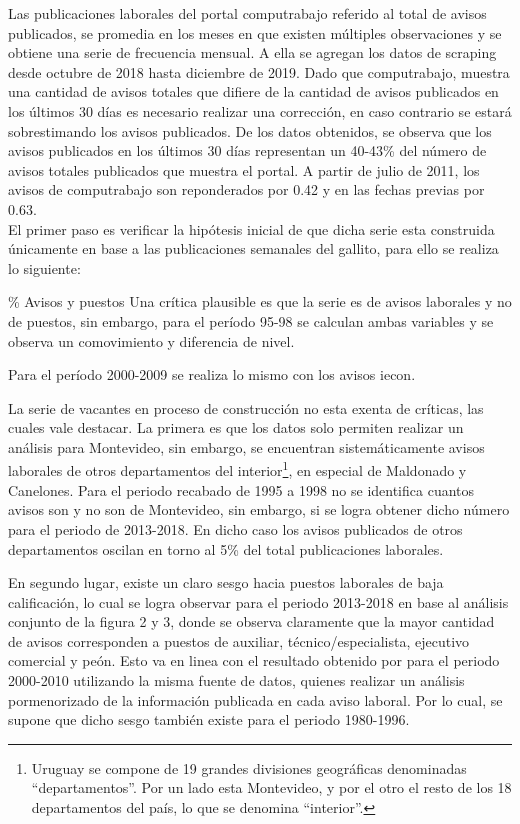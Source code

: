 \documentclass[msc,oneside,a4paper]{udelar} %
\begin{document}
  Las publicaciones laborales del portal computrabajo referido al total de avisos publicados, se promedia en los meses en que existen múltiples observaciones y se obtiene una serie de frecuencia mensual. A ella se agregan los datos de scraping desde octubre de 2018 hasta diciembre de 2019. Dado que computrabajo, muestra una cantidad de avisos totales que difiere de la cantidad de avisos publicados en los últimos 30 días es necesario realizar una corrección, en caso contrario se estará sobrestimando los avisos publicados. De los datos obtenidos, se observa que los avisos publicados en los últimos 30 días representan un 40-43\% del número de avisos totales publicados que muestra el portal. A partir de julio de 2011, los avisos de computrabajo son reponderados por 0.42 y en las fechas previas por 0.63.\\
  
  El primer paso es verificar la hipótesis inicial de que dicha serie esta construida únicamente en base a las publicaciones semanales del gallito, para ello se realiza lo siguiente:
  
  \% Avisos y puestos
  Una crítica plausible es que la serie es de avisos laborales y no de puestos, sin embargo, para el período 95-98 se calculan ambas variables y se observa un comovimiento y diferencia de nivel.
  
  Para el período 2000-2009 se realiza lo mismo con los avisos iecon.
  
  La serie de vacantes en proceso de construcción no esta exenta de críticas, las cuales vale destacar. La primera es que los datos solo permiten realizar un análisis para Montevideo, sin embargo, se encuentran sistemáticamente avisos laborales de otros departamentos del interior\footnote{Uruguay se compone de 19 grandes divisiones geográficas denominadas ``departamentos''. Por un lado esta Montevideo, y por el otro el resto de los 18 departamentos del país, lo que se denomina ``interior''.}, en especial de Maldonado y Canelones. Para el periodo recabado de 1995 a 1998 no se identifica cuantos avisos son y no son de Montevideo, sin embargo, si se logra obtener dicho número para el periodo de 2013-2018. En dicho caso los avisos publicados de otros departamentos oscilan en torno al 5\% del total publicaciones laborales.
  
  En segundo lugar, existe un claro sesgo hacia puestos laborales de baja calificación, lo cual se logra observar para el periodo 2013-2018 en base al análisis conjunto de la figura 2 y 3, donde se observa claramente que la mayor cantidad de avisos corresponden a puestos de auxiliar, técnico/especialista, ejecutivo comercial y peón. Esto va en linea con el resultado obtenido por \cite{Alma2011} para el periodo 2000-2010 utilizando la misma fuente de datos, quienes realizar un análisis pormenorizado de la información publicada en cada aviso laboral. Por lo cual, se supone que dicho sesgo también existe para el periodo 1980-1996.
  
\end{document}

